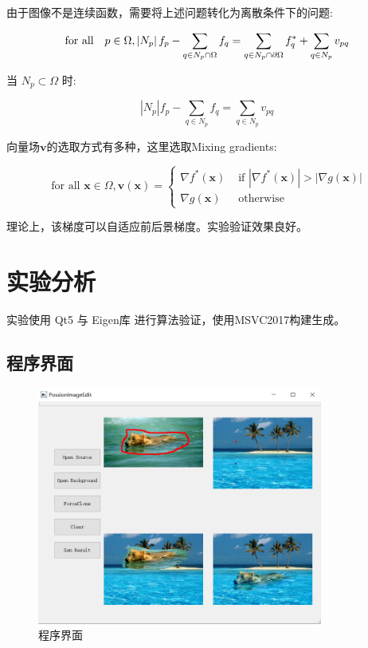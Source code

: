 \documentclass[12pt]{article}
\begin{document}
		
		由于图像不是连续函数，需要将上述问题转化为离散条件下的问题:
		
		$$\text{for all\quad} p \in \Omega, \left|N_{p}\right| f_{p}-\sum_{q \in N_{p} \cap \Omega} f_{q}=\sum_{q \in N_{p} \cap \partial \Omega} f_{q}^{*}+\sum_{q \in N_{p}} v_{p q}$$
		
		当 $N_{p} \subset \Omega$ 时:
		
		$$
		\left|N_{p}\right| f_{p}-\sum_{q \in N_{p}} f_{q}=\sum_{q \in N_{p}} v_{p q}
		$$
		
		向量场$\mathbf{v}$的选取方式有多种，这里选取Mixing gradients:
		
		$$
		\text { for all } \mathbf{x} \in \Omega, \mathbf{v}(\mathbf{x})= \begin{cases}\nabla f^{*}(\mathbf{x}) & \text { if }\left|\nabla f^{*}(\mathbf{x})\right|>|\nabla g(\mathbf{x})| \\ \nabla g(\mathbf{x}) & \text { otherwise }\end{cases}
		$$
		
		理论上，该梯度可以自适应前后景梯度。实验验证效果良好。

	\section{实验分析}
	实验使用 Qt5 与 Eigen库 进行算法验证，使用MSVC2017构建生成。
	
		\subsection{程序界面}
	\begin{figure}[H]
		\centering
		\includegraphics[width=3.7in]{./ui.png}
		\centering
		\caption{程序界面}
	\end{figure}
	
\end{document}

